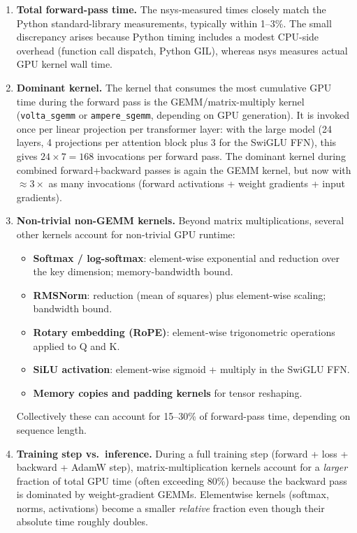 \documentclass[11pt]{article}
\begin{document}
\begin{enumerate}
  \item \textbf{Total forward-pass time.} The nsys-measured times closely match the
        Python standard-library measurements, typically within 1--3\%. The small
        discrepancy arises because Python timing includes a modest CPU-side overhead
        (function call dispatch, Python GIL), whereas nsys measures actual GPU kernel
        wall time.

  \item \textbf{Dominant kernel.} The kernel that consumes the most cumulative GPU time
        during the forward pass is the GEMM/matrix-multiply kernel (\texttt{volta\_sgemm}
        or \texttt{ampere\_sgemm}, depending on GPU generation). It is invoked once per
        linear projection per transformer layer: with the large model (24 layers, 4
        projections per attention block plus 3 for the SwiGLU FFN), this gives
        $24 \times 7 = 168$ invocations per forward pass. The dominant kernel during
        combined forward+backward passes is again the GEMM kernel, but now with
        $\approx 3\times$ as many invocations (forward activations + weight gradients
        + input gradients).

  \item \textbf{Non-trivial non-GEMM kernels.}
        Beyond matrix multiplications, several other kernels account for non-trivial
        GPU runtime:
        \begin{itemize}
          \item \textbf{Softmax / log-softmax}: element-wise exponential and reduction
                over the key dimension; memory-bandwidth bound.
          \item \textbf{RMSNorm}: reduction (mean of squares) plus element-wise
                scaling; bandwidth bound.
          \item \textbf{Rotary embedding (RoPE)}: element-wise trigonometric operations
                applied to Q and K.
          \item \textbf{SiLU activation}: element-wise sigmoid + multiply in the
                SwiGLU FFN.
          \item \textbf{Memory copies and padding kernels} for tensor reshaping.
        \end{itemize}
        Collectively these can account for 15--30\% of forward-pass time, depending on
        sequence length.

  \item \textbf{Training step vs.\ inference.}
        During a full training step (forward + loss + backward + AdamW step),
        matrix-multiplication kernels account for a \emph{larger} fraction of total
        GPU time (often exceeding 80\%) because the backward pass is dominated by
        weight-gradient GEMMs. Elementwise kernels (softmax, norms, activations)
        become a smaller \emph{relative} fraction even though their absolute time
        roughly doubles.


\end{enumerate}
\end{document}
